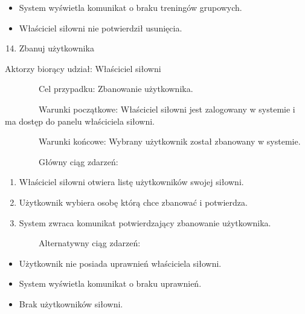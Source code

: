 \documentclass[
]{article}
\providecommand{\tightlist}{%
  \setlength{\itemsep}{0pt}\setlength{\parskip}{0pt}}
\begin{document}
\begin{itemize}
\tightlist
\item
  {System wyświetla komunikat o braku treningów grupowych.}
\end{itemize}

\begin{itemize}
\tightlist
\item
  {Właściciel siłowni nie potwierdził usunięcia.\\
  }
\end{itemize}

\begin{enumerate}
\setcounter{enumi}{13}
\tightlist
\item
  {Zbanuj użytkownika}
\end{enumerate}

{Aktorzy biorący udział: Właściciel siłowni}

{~~~~~~~~Cel przypadku: Zbanowanie użytkownika.}

{~~~~~~~~Warunki początkowe: Właściciel siłowni jest zalogowany w
systemie i ma dostęp do panelu właściciela siłowni.}

{~~~~~~~~Warunki końcowe: Wybrany użytkownik został zbanowany w
systemie.}

{~~~~~~~~Główny ciąg zdarzeń:}

\begin{enumerate}
\tightlist
\item
  {Właściciel siłowni otwiera listę użytkowników swojej siłowni.}
\item
  {Użytkownik wybiera osobę którą chce zbanować i potwierdza.}
\item
  {System zwraca komunikat potwierdzający zbanowanie użytkownika.}
\end{enumerate}

{~~~~~~~~Alternatywny ciąg zdarzeń:}

\begin{itemize}
\tightlist
\item
  {Użytkownik nie posiada uprawnień właściciela siłowni.}
\end{itemize}

\begin{itemize}
\tightlist
\item
  {System wyświetla komunikat o braku uprawnień.}
\end{itemize}

\begin{itemize}
\tightlist
\item
  {Brak użytkowników siłowni.}
\end{itemize}
\end{document}

